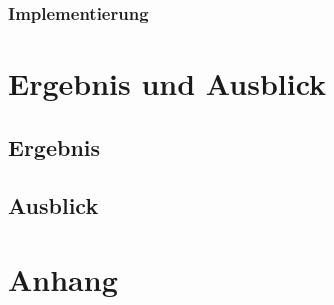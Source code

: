 \documentclass[12pt,             %
               a4paper,          %
               listof=totoc,     %
               index=totoc,      %
               bibliography=totoc,%
               oneside,         %
               BCOR1cm,          %
               english   %
               ]{scrbook}
\begin{document}
\subsection{Implementierung}
\clearpage


\chapter{Ergebnis und Ausblick}
\section{Ergebnis}
\section{Ausblick}

\clearpage
\chapter{Anhang}

\newpage
\listoffigures

\newpage
\listoftables

\newpage
\lstlistoflistings

\newpage

\end{document}
